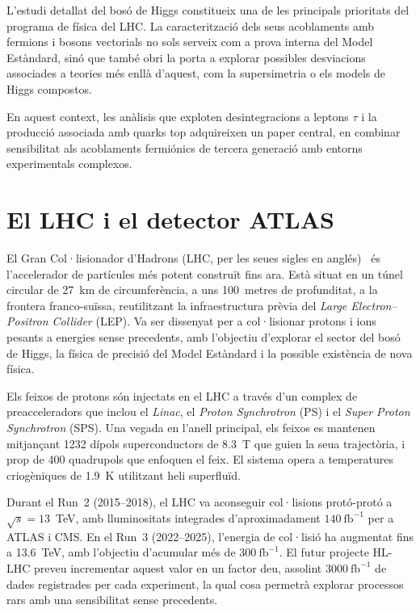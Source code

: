 L’estudi detallat del bosó de Higgs constitueix una de les principals prioritats del programa de física del LHC. La caracterització dels seus acoblaments amb fermions i bosons vectorials no sols serveix com a prova interna del Model Estàndard, sinó que també obri la porta a explorar possibles desviacions associades a teories més enllà d’aquest, com la supersimetria o els models de Higgs compostos.  

En aquest context, les anàlisis que exploten desintegracions a leptons $\tau$ i la producció associada amb quarks top adquireixen un paper central, en combinar sensibilitat als acoblaments fermiónics de tercera generació amb entorns experimentals complexos.


\section*{El LHC i el detector ATLAS}

El Gran Col·lisionador d’Hadrons (LHC, per les seues sigles en anglés)~\cite{Evans:1129806, Bruning:782076} és l’accelerador de partícules més potent construït fins ara. Està situat en un túnel circular de 27~km de circumferència, a uns 100~metres de profunditat, a la frontera franco-suïssa, reutilitzant la infraestructura prèvia del \textit{Large Electron–Positron Collider} (LEP). Va ser dissenyat per a col·lisionar protons i ions pesants a energies sense precedents, amb l’objectiu d’explorar el sector del bosó de Higgs, la física de precisió del Model Estàndard i la possible existència de nova física.

Els feixos de protons són injectats en el LHC a través d’un complex de preacceleradors que inclou el \textit{Linac}, el \textit{Proton Synchrotron} (PS) i el \textit{Super Proton Synchrotron} (SPS). Una vegada en l’anell principal, els feixos es mantenen mitjançant 1232 dípols superconductors de 8.3~T que guien la seua trajectòria, i prop de 400 quadrupols que enfoquen el feix. El sistema opera a temperatures criogèniques de 1.9~K utilitzant heli superfluïd.

Durant el Run~2 (2015–2018), el LHC va aconseguir col·lisions protó-protó a $\sqrt{s} = 13$~TeV, amb lluminositats integrades d’aproximadament $140~\text{fb}^{-1}$ per a ATLAS i CMS. En el Run~3 (2022–2025), l’energia de col·lisió ha augmentat fins a 13.6~TeV, amb l’objectiu d’acumular més de $300~\text{fb}^{-1}$. El futur projecte HL-LHC preveu incrementar aquest valor en un factor deu, assolint $3000~\text{fb}^{-1}$ de dades registrades per cada experiment, la qual cosa permetrà explorar processos rars amb una sensibilitat sense precedents.

